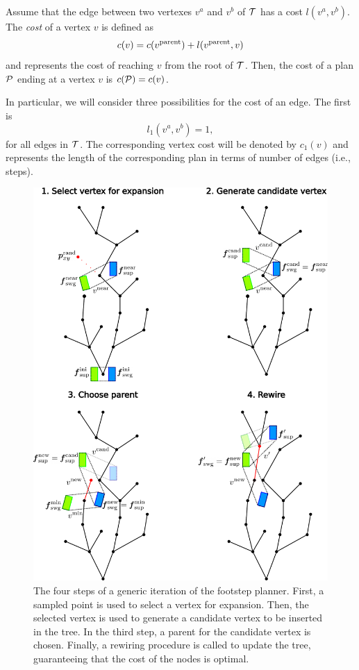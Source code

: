 Assume that the edge between two vertexes $v^a$ and $v^b$ of $\cal T$ has a
cost $l(v^a,v^b)$. 
The {\em cost} of a vertex $v$ is defined as
\[
c(v) = c(v^{\rm parent}) + l(v^{\rm parent}, v)
\]
and represents the cost of reaching $v$ from the root of $\cal T$. 
Then, the cost of a plan $\cal P$ ending at a vertex $v$ is $c({\cal P}) = c(v)$.

In particular, we will consider three possibilities for the cost of an edge.
The first is
\begin{equation}
l_1(v^a, v^b) = 1,
\label{eq:WoS:costSteps}
\end{equation}
for all edges in $\cal T$. The corresponding vertex cost will be denoted by
$c_1(v)$ and represents the length of the corresponding plan in terms of number
of edges (i.e., steps). 
    
\begin{figure}
\centering
\includegraphics[width=\textwidth]{figures/FootstepPlanner.pdf}
\caption{The four steps of a generic iteration of the footstep planner.
First, a sampled point is used to select a vertex for expansion.
Then, the selected vertex is used to generate a candidate vertex to be inserted
in the tree.
In the third step, a parent for the candidate vertex is chosen.
Finally, a rewiring procedure is called to update the tree, guaranteeing that
the cost of the nodes is optimal.}
\label{fig:WoS:FootstepPlanner}
\end{figure}   
    
